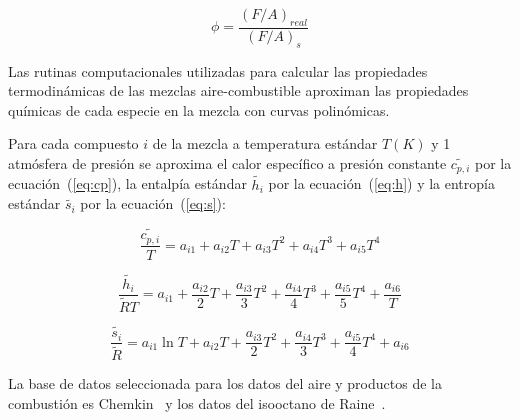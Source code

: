 \begin{equation}\label{eq:phi}
  \phi = \frac{{(F/A)}_{real}}{{(F/A)}_{s}}
\end{equation}

Las rutinas computacionales utilizadas para calcular las propiedades
termodinámicas de las mezclas aire-combustible aproximan las propiedades
químicas de cada especie en la mezcla con curvas polinómicas.

%

Para cada compuesto $i$ de la mezcla a temperatura estándar $T(K)$ y 1 atmósfera
de presión se aproxima el calor específico a presión constante
$\widetilde{c_{p,i}}$ por la ecuación~(\ref{eq:cp}), la entalpía estándar
$\widetilde{h_{i}}$ por la ecuación~(\ref{eq:h}) y la entropía estándar
$\widetilde{s_{i}}$ por la ecuación~(\ref{eq:s}):


\begin{equation}\label{eq:cp} \frac{\widetilde{c_{p,i}}}{T} = a_{i1} + a_{i2}T + a_{i3}T^{2} + a_{i4}T^{3} + a_{i5}T^{4}
\end{equation}

\begin{equation}\label{eq:h} \frac{\widetilde{h_{i}}}{\widetilde{R}T} = a_{i1} + \frac{a_{i2}}{2}T + \frac{a_{i3}}{3}T^{2} + \frac{a_{i4}}{4}T^{3} + \frac{a_{i5}}{5}T^{4} +\frac{a_{i6}}{T}
\end{equation}

\begin{equation}\label{eq:s} \frac{\widetilde{s_{i}}}{\widetilde{R}} = a_{i1} \ln{T} + a_{i2}T + \frac{a_{i3}}{2}T^{2} + \frac{a_{i4}}{3}T^{3} + \frac{a_{i5}}{4}T^{4} + a_{i6}
\end{equation}


La base de datos seleccionada para los datos del aire y productos de la
combustión es Chemkin~\parencite{chemkin} y los datos del isooctano de
Raine~\parencite{raine}.

